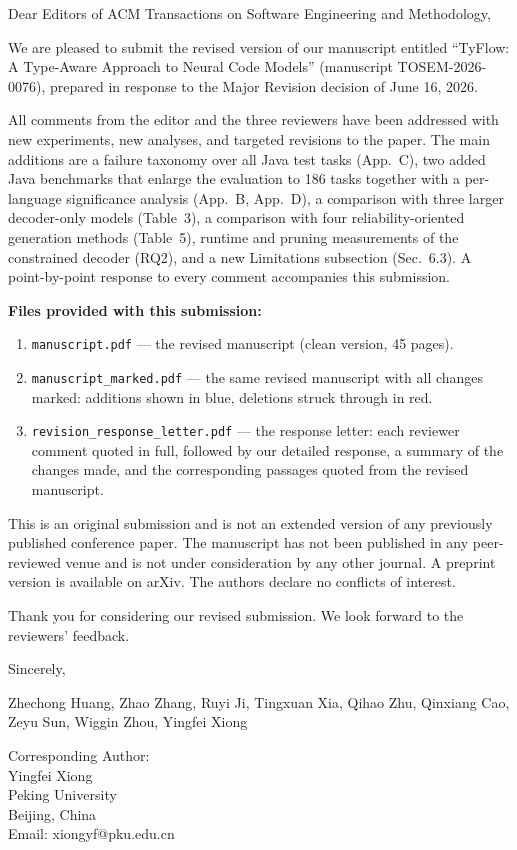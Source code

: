 \documentclass[11pt,a4paper]{article}
\begin{document}
Dear Editors of ACM Transactions on Software Engineering and Methodology,

We are pleased to submit the revised version of our manuscript entitled ``TyFlow: A Type-Aware Approach to Neural Code Models'' (manuscript TOSEM-2026-0076), prepared in response to the Major Revision decision of June 16, 2026.

All comments from the editor and the three reviewers have been addressed with new experiments, new analyses, and targeted revisions to the paper. The main additions are a failure taxonomy over all Java test tasks (App.~C), two added Java benchmarks that enlarge the evaluation to 186 tasks together with a per-language significance analysis (App.~B, App.~D), a comparison with three larger decoder-only models (Table~3), a comparison with four reliability-oriented generation methods (Table~5), runtime and pruning measurements of the constrained decoder (RQ2), and a new Limitations subsection (Sec.~6.3). A point-by-point response to every comment accompanies this submission.

\textbf{Files provided with this submission:}
\begin{enumerate}
  \item \texttt{manuscript.pdf} --- the revised manuscript (clean version, 45 pages).
  \item \texttt{manuscript\_marked.pdf} --- the same revised manuscript with all changes marked: additions shown in blue, deletions struck through in red.
  \item \texttt{revision\_response\_letter.pdf} --- the response letter: each reviewer comment quoted in full, followed by our detailed response, a summary of the changes made, and the corresponding passages quoted from the revised manuscript.
\end{enumerate}

This is an original submission and is not an extended version of any previously published conference paper. The manuscript has not been published in any peer-reviewed venue and is not under consideration by any other journal. A preprint version is available on arXiv. The authors declare no conflicts of interest.

Thank you for considering our revised submission. We look forward to the reviewers' feedback.

Sincerely,

Zhechong Huang, Zhao Zhang, Ruyi Ji, Tingxuan Xia, Qihao Zhu, Qinxiang Cao, Zeyu Sun, Wiggin Zhou, Yingfei Xiong

\bigskip
Corresponding Author:\\
Yingfei Xiong\\
Peking University\\
Beijing, China\\
Email: xiongyf@pku.edu.cn
\end{document}
